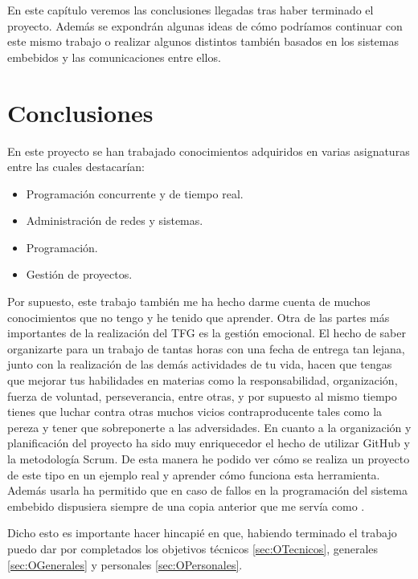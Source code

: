 
En este capítulo veremos las conclusiones llegadas tras haber terminado el proyecto. Además se expondrán algunas ideas de cómo podríamos continuar con este mismo trabajo o realizar algunos distintos también basados en los sistemas embebidos y las comunicaciones entre ellos.


\section{Conclusiones} \label{sec:Conclusiones}
En este proyecto se han trabajado conocimientos adquiridos en varias asignaturas entre las cuales destacarían:

\begin{itemize}
\item Programación concurrente y de tiempo real.
\item Administración de redes y sistemas.
\item Programación.
\item Gestión de proyectos.
\end{itemize}

Por supuesto, este trabajo también me ha hecho darme cuenta de muchos conocimientos que no tengo y he tenido que aprender.
Otra de las partes más importantes de la realización del TFG es la gestión emocional. El hecho de saber organizarte para un trabajo de tantas horas con una fecha de entrega tan lejana, junto con la realización de las demás actividades de tu vida, hacen que tengas que mejorar tus habilidades en materias como la responsabilidad, organización, fuerza de voluntad, perseverancia, entre otras, y por supuesto al mismo tiempo tienes que luchar contra otras muchos vicios contraproducente tales como la pereza y tener que sobreponerte a las adversidades. 
En cuanto a la organización y planificación del proyecto ha sido muy enriquecedor el hecho de utilizar GitHub y la metodología Scrum. De esta manera he podido ver cómo se realiza un proyecto de este tipo en un ejemplo real y aprender cómo funciona esta herramienta. Además usarla ha permitido que en caso de fallos en la programación del sistema embebido dispusiera siempre de una copia anterior que me servía como .

Dicho esto es importante hacer hincapié en que, habiendo terminado el trabajo puedo dar por completados los objetivos técnicos \ref{sec:OTecnicos}, generales \ref{sec:OGenerales} y personales \ref{sec:OPersonales}. 

